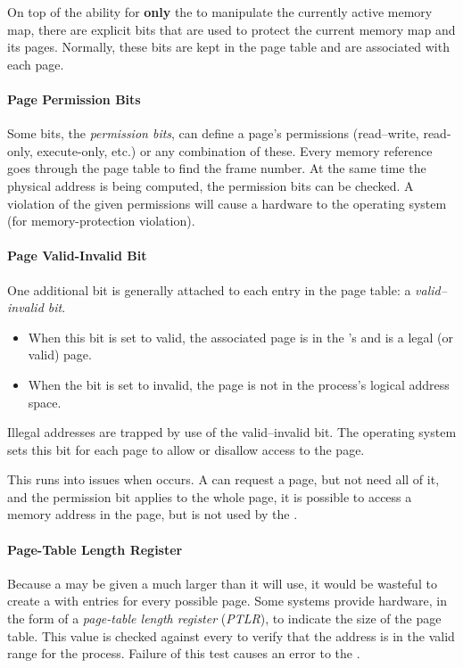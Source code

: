 On top of the ability for \textbf{only} the  to manipulate the currently active memory map, there are explicit bits that are used to protect the current memory map and its pages.
Normally, these bits are kept in the page table and are associated with each page.

\paragraph{Page Permission Bits}\label{par:Page_Permission_Bits}
Some bits, the \emph{permission bits}, can define a page's permissions (read–write, read-only, execute-only, etc.) or any combination of these.
Every memory reference goes through the page table to find the frame number.
At the same time the physical address is being computed, the permission bits can be checked.
A violation of the given permissions will cause a hardware  to the operating system (for memory-protection violation).

\paragraph{Page Valid-Invalid Bit}\label{par:Page_Valid_Invalid_Bit}
One additional bit is generally attached to each entry in the page table: a \emph{valid–invalid bit}.

\begin{itemize}[noitemsep]
\item When this bit is set to valid, the associated page is in the ’s  and is a legal (or valid) page.
\item When the bit is set to invalid, the page is not in the process’s logical address space.
\end{itemize}

Illegal addresses are trapped by use of the valid–invalid bit.
The operating system sets this bit for each page to allow or disallow access to the page.

This runs into issues when  occurs.
A  can request a page, but not need all of it, and the permission bit applies to the whole page, it is possible to access a memory address in the page, but is not used by the .

\paragraph{Page-Table Length Register}\label{par:Page_Table_Length_Register}
Because a  may be given a much larger  than it will use, it would be wasteful to create a  with entries for every possible page.
Some systems provide hardware, in the form of a \emph{page-table length register} (\emph{PTLR}), to indicate the size of the page table.
This value is checked against every  to verify that the address is in the valid range for the process.
Failure of this test causes an error  to the .

